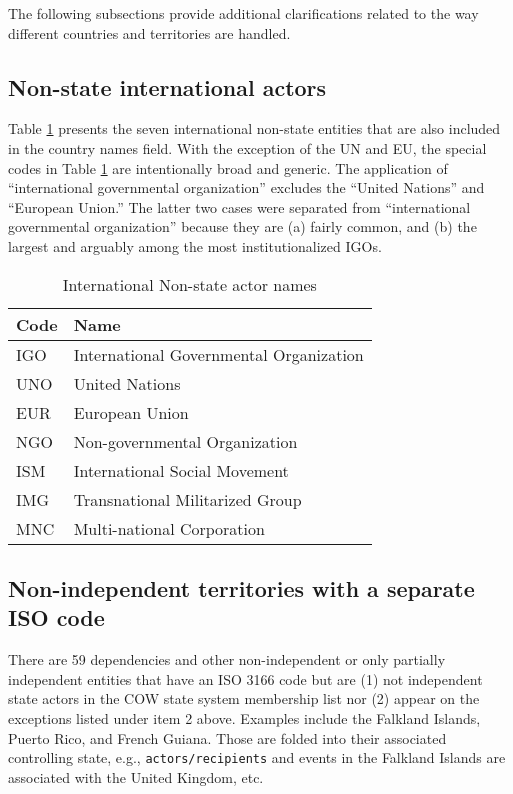 \documentclass[11pt]{report}
\begin{document}
The following subsections provide additional clarifications related to the way different countries and territories are handled.

\subsection{Non-state international actors}

Table \ref{tab:nonstate} presents the seven international non-state entities that are also included in the country names field. With the exception of the UN and EU, the special codes in Table \ref{tab:nonstate} are intentionally broad and generic. The application of ``international governmental organization'' excludes the ``United Nations'' and ``European Union.'' The latter two cases were separated from ``international governmental organization'' because they are (a) fairly common, and (b) the largest and arguably among the most institutionalized IGOs.

\begin{table}[htp]
\caption{International Non-state actor names}
\begin{center}
\begin{tabular}{|l|l|}
\hline
Code & Name \\
\hline
IGO   &   International Governmental Organization \\
UNO & United Nations \\
EUR & European Union \\
NGO &   Non-governmental Organization\\
ISM           &   International Social Movement\\
IMG            &   Transnational Militarized Group\\
MNC            &   Multi-national Corporation\\
\hline
\end{tabular}
\end{center}
\label{tab:nonstate}
\end{table}%

\subsection{Non-independent territories with a separate ISO code}

There are 59 dependencies and other non-independent or only partially independent entities that have an ISO 3166 code but are (1) not independent state actors in the COW state system membership list nor (2) appear on the exceptions listed under item 2 above. Examples include the Falkland Islands, Puerto Rico, and French Guiana. Those are folded into their associated controlling state, e.g., \texttt{actors/recipients} and events in the Falkland Islands are associated with the United Kingdom, etc.
\end{document}
